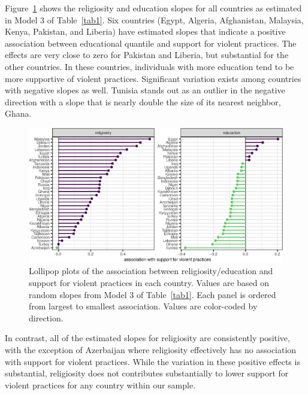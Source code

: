 \documentclass[10pt,letterpaper]{article}
\begin{document}
Figure~\ref{fig3} shows the religiosity and education slopes for all countries as estimated in Model 3 of Table~\ref{tab1}. Six countries (Egypt, Algeria, Afghanistan, Malaysia, Kenya, Pakistan, and Liberia) have estimated slopes that indicate a positive association between educational quantile and support for violent practices. The effects are very close to zero for Pakistan and Liberia, but substantial for the other countries. In these countries, individuals with more education tend to be more supportive of violent practices. Significant variation exists among countries with negative slopes as well. Tunisia stands out as an outlier in the negative direction with a slope that is nearly double the size of its nearest neighbor, Ghana.

\begin{figure}[!h]
\begin{adjustwidth}{-2.25in}{0in}
\centering
\includegraphics{figures/fig3.eps}
\caption{Lollipop plots of the association between religiosity/education
and support for violent practices in each country. Values are based on
random slopes from Model 3 of Table~\ref{tab1}. Each panel is ordered from
largest to smallest association. Values are color-coded by direction.}
\label{fig3}
\end{adjustwidth}
\end{figure}

In contrast, all of the estimated slopes for religiosity are
consistently positive, with the exception of Azerbaijan where
religiosity effectively has no association with support for violent
practices. While the variation in these positive effects is substantial,
religiosity does not contributes substantially to lower support for
violent practices for any country within our sample.
\end{document}
